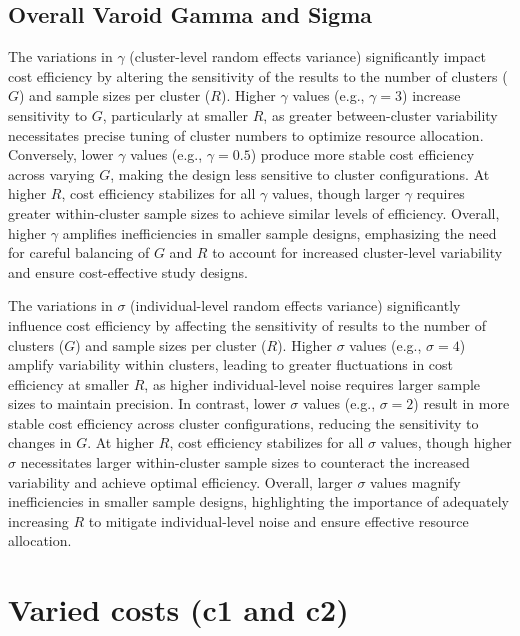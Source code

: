 \documentclass[
]{article}
\begin{document}
\hypertarget{overall-varoid-gamma-and-sigma}{%
\subsection{Overall Varoid Gamma and
Sigma}\label{overall-varoid-gamma-and-sigma}}

The variations in \(\gamma\) (cluster-level random effects variance)
significantly impact cost efficiency by altering the sensitivity of the
results to the number of clusters (\(G\)) and sample sizes per cluster
(\(R\)). Higher \(\gamma\) values (e.g., \(\gamma = 3\)) increase
sensitivity to \(G\), particularly at smaller \(R\), as greater
between-cluster variability necessitates precise tuning of cluster
numbers to optimize resource allocation. Conversely, lower \(\gamma\)
values (e.g., \(\gamma = 0.5\)) produce more stable cost efficiency
across varying \(G\), making the design less sensitive to cluster
configurations. At higher \(R\), cost efficiency stabilizes for all
\(\gamma\) values, though larger \(\gamma\) requires greater
within-cluster sample sizes to achieve similar levels of efficiency.
Overall, higher \(\gamma\) amplifies inefficiencies in smaller sample
designs, emphasizing the need for careful balancing of \(G\) and \(R\)
to account for increased cluster-level variability and ensure
cost-effective study designs.

The variations in \(\sigma\) (individual-level random effects variance)
significantly influence cost efficiency by affecting the sensitivity of
results to the number of clusters (\(G\)) and sample sizes per cluster
(\(R\)). Higher \(\sigma\) values (e.g., \(\sigma = 4\)) amplify
variability within clusters, leading to greater fluctuations in cost
efficiency at smaller \(R\), as higher individual-level noise requires
larger sample sizes to maintain precision. In contrast, lower \(\sigma\)
values (e.g., \(\sigma = 2\)) result in more stable cost efficiency
across cluster configurations, reducing the sensitivity to changes in
\(G\). At higher \(R\), cost efficiency stabilizes for all \(\sigma\)
values, though higher \(\sigma\) necessitates larger within-cluster
sample sizes to counteract the increased variability and achieve optimal
efficiency. Overall, larger \(\sigma\) values magnify inefficiencies in
smaller sample designs, highlighting the importance of adequately
increasing \(R\) to mitigate individual-level noise and ensure effective
resource allocation.

\hypertarget{varied-costs-c1-and-c2}{%
\section{Varied costs (c1 and c2)}\label{varied-costs-c1-and-c2}}
\end{document}
